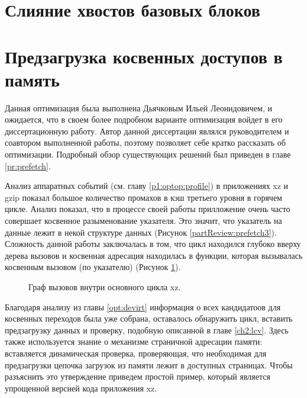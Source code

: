 \section{Слияние хвостов базовых блоков} 

\section{Предзагрузка косвенных доступов в память} \label{opt:prefetch}
Данная оптимизация была выполнена Дьячковым Ильей Леонидовичем, и ожидается, что в своем более подробном варианте оптимизация войдет в его диссертационную работу.  Автор данной диссертации являлся руководителем и соавтором выполненной работы, поэтому позволяет себе кратко рассказать  об оптимизации.  Подробный обзор существующих решений был приведен в главе \ref{pr:prefetch}. 

Анализ аппаратных событий (см. главу \ref{p1:optop:profile}) в приложениях xz и gzip показал большое количество промахов в кэш третьего уровня в горячем цикле. Анализ показал, что в процессе своей работы прилложение очень часто совершает косвенное разыменование указателя. Это значит, что указатель на данные лежит в некой структуре данных (Рисунок \ref{partReview:prefetch3}). Сложность данной работы заключалась в том, что цикл находился глубоко вверху дерева вызовов и косвенная адресация находилась в функции, которая вызывалась косвенным вызовом (по указателю) (Рисунок \ref{optpref1}). 
\begin{figure}[htbp]
	\centering
	
	\caption{Граф вызовов внутри основного цикла xz.}
	\label{optpref1}
\end{figure}
Благодаря анализу из главы \ref{opt:devirt} информация о всех кандидатоов для косвенных переходов была уже собрана, оставалось обнаружить цикл, вставить предзагрузку данных и проверку, подобную описанной в главе \ref{ch2:lcv}. Здесь также используется знание о механизме страничной адресации памяти: вставляется динамическая проверка, проверяющая, что необходимая для предзагрузки цепочка загрузок из памяти лежит в доступных страницах. Чтобы разъяснить это утверждение приведем простой пример, который является упрощенной версией кода приложения xz.

